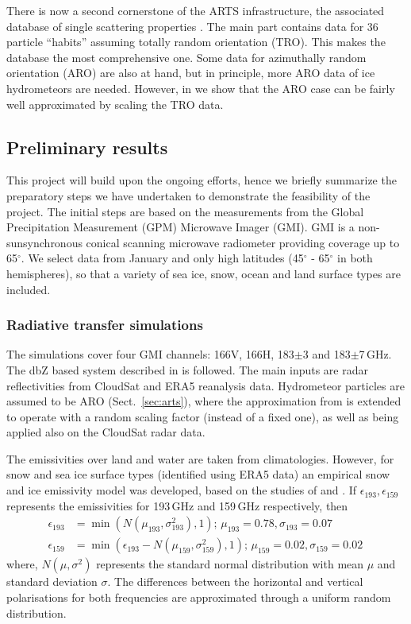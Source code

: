 \documentclass[12pt,oneside,a4paper]{article}
\begin{document}
There is now a second cornerstone of the ARTS infrastructure, the associated
database of single scattering properties \citep{eriksson:agene:18}. The main
part contains data for 36 particle ``habits'' assuming totally random
orientation (TRO). This makes the database the most comprehensive one. Some
data for azimuthally random orientation (ARO) are also at hand, but in 
principle, more ARO data of ice hydrometeors are needed. However, in \citet{barlakas:intro:21} we show that the ARO case can be fairly well approximated by scaling the TRO data.

\subsection{Preliminary results}
%
This project will build upon the ongoing efforts, hence we briefly summarize
the preparatory steps we have undertaken to demonstrate the feasibility of the
project. The initial steps are based on the measurements from the Global
Precipitation Measurement (GPM) Microwave Imager (GMI). GMI is a
non-sunsynchronous conical scanning microwave radiometer providing coverage
up to 65$^{\circ}$. We select data from January and only high latitudes
(45$^{\circ}$ - 65$^{\circ}$ in both hemispheres), so that a variety of
sea ice, snow, ocean and land surface types are included.

\subsubsection{Radiative transfer simulations}
%
\label{sec:radiative_transfer}
The simulations cover four GMI channels: 166V, 166H, 183$\pm$3
and 183$\pm$7\,GHz. The dbZ based
system described in \citet{ekelund:using:20} is followed. The
main inputs are radar reflectivities from CloudSat and ERA5 reanalysis data.
Hydrometeor particles are assumed to be ARO (Sect.~\ref{sec:arts}), where the
approximation from \citet{barlakas:intro:21} is extended to operate with 
a random scaling factor (instead of a fixed one), as well as being applied also
on the CloudSat radar data.

The emissivities over land and water are taken from climatologies. However, for
snow and sea ice surface types (identified using ERA5 data) an empirical snow
and ice emissivity model was developed, based on the studies of
\citet{harlow:2009:milli} and \citet{hewison:2002:airbo}. If
$\epsilon_{193}, \epsilon_{159}$ represents the emissivities for 193\,GHz and
159\,GHz respectively, then
\begin{align}
\epsilon_{193}& = \min({N(\mu_{193}, \sigma_{193}^{2}), 1});\, \mu_{193} = 0.78, \sigma_{193} = 0.07 \label{eq:1}\\
\epsilon_{159}& = \min(\epsilon_{193} - N(\mu_{159}, \sigma_{159}^{2}), 1) ;\,  \mu_{159} = 0.02, \sigma_{159} = 0.02\,\label{eq:2}
\end{align}
where, $N(\mu, \sigma^{2})$ represents the standard normal distribution with
mean $\mu$ and standard deviation $\sigma$. The differences between the
horizontal and vertical polarisations for both frequencies are 
approximated through a uniform random distribution.
\end{document}
